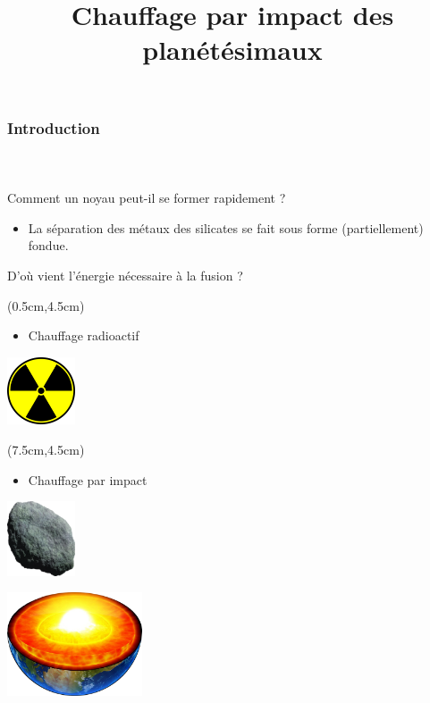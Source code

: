 \documentclass{beamer}
\begin{document}
\title{Chauffage par impact des planétésimaux}
\begin{frame}
\frametitle{Introduction}
\framesubtitle{\ }

\begin{center}
 \Large Comment un noyau peut-il se former rapidement ?
\end{center}

\begin{itemize}
\item La séparation des métaux des silicates se fait sous forme (partiellement) fondue.
\end{itemize}

\begin{center}
 \Large D'où vient l'énergie nécessaire à la fusion ?
\end{center}

\begin{textblock*}{5cm}(0.5cm,4.5cm) %
	\center
	\begin{itemize}
		\item Chauffage radioactif
	\end{itemize}
	\vspace{0.1cm}
	
    \includegraphics[width = 2cm]{figures/radioactif.png}
\end{textblock*}

\begin{textblock*}{5cm}(7.5cm,4.5cm) %
	\center
	\begin{itemize}
		\item Chauffage par impact
	\end{itemize}
	
	\vspace{0.1cm}
    \includegraphics[width = 2cm]{figures/asteroid.png}
\end{textblock*}

\center
\vspace{1cm}
\includegraphics[width = 4cm]{figures/terre_core.pdf}

\end{frame}
\end{document}
